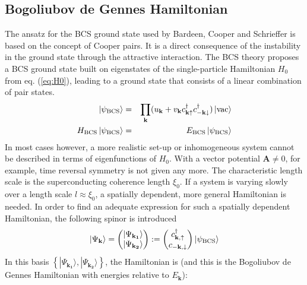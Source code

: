 \subsection*{Bogoliubov de Gennes Hamiltonian}
The ansatz for the BCS ground state used by Bardeen, Cooper and Schrieffer is based on the concept of Cooper pairs. It is a direct consequence of the instability in the ground state through the attractive interaction. The BCS theory proposes a BCS ground state built on eigenstates of the single-particle Hamiltonian $H_0$ from eq. (\ref{eq:H0}), leading to a ground state that consists of a linear combination of pair states. %
\begin{eqnarray}
\ket{\psi_\text{BCS}} &=& \prod_{ \mathbf{k} } (u_\mathbf{k} + v_\mathbf{k} c^{\dagger}_{ \mathbf{k} \uparrow } c^{\dagger}_{ - \mathbf{k} \downarrow }) \ket{\text{vac}} \\
H_\text{BCS} \ket{\psi_\text{BCS}} &=& E_\text{BCS} \ket{\psi_\text{BCS}}  
\end{eqnarray}
In most cases however, a more realistic set-up or inhomogeneous system cannot be described in terms of eigenfunctions of $H_0$. With a vector potential $\mathbf{A} \neq 0$, for example, time reversal symmetry is not given any more. %
The characteristic length scale is the superconducting coherence length $\xi_0$. If a system is varying slowly over a length scale $l \approx \xi_0$, a spatially dependent, more general Hamiltonian is needed. 
In order to find an adequate expression for such a spatially dependent Hamiltonian, the following spinor is introduced
\begin{equation}
\ket{\Psi_\mathbf{k}} = \begin{pmatrix}
| \Psi_\mathbf{k_1} \rangle \\ | \Psi_\mathbf{k_2} \rangle
\end{pmatrix} := \begin{pmatrix}
c^{\dagger}_{\mathbf{k}, \uparrow} \\ c_{- \mathbf{k}, \downarrow}
\end{pmatrix} \ket{\psi_\text{BCS}}
\end{equation}
In this basis $\left\{| \Psi_\mathbf{k_1} \rangle, | \Psi_\mathbf{k_2} \rangle \right\}$, the Hamiltonian is (and this is the Bogoliubov de Gennes Hamiltonian with energies relative to $E_\mathbf{k}$):
